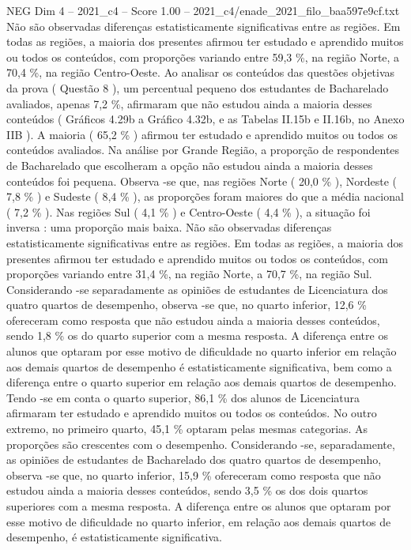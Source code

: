 \begin{textsample}{NEG Dim 4 – 2021\_c4 – Score 1.00 – 2021\_c4/enade\_2021\_filo\_baa597e9cf.txt}
Não são observadas diferenças estatisticamente significativas entre as regiões.
Em todas as regiões, a maioria dos presentes afirmou ter estudado e aprendido muitos ou todos os conteúdos, com proporções variando entre 59,3 \%, na região Norte, a 70,4 \%, na região Centro-Oeste.
Ao analisar os conteúdos das questões objetivas da prova ( Questão 8 ), um percentual pequeno dos estudantes de Bacharelado avaliados, apenas 7,2 \%, afirmaram que não estudou ainda a maioria desses conteúdos ( Gráficos 4.29b a Gráfico 4.32b, e as Tabelas II.15b e II.16b, no Anexo IIB ).
A maioria ( 65,2 \% ) afirmou ter estudado e aprendido muitos ou todos os conteúdos avaliados.
Na análise por Grande Região, a proporção de respondentes de Bacharelado que escolheram a opção não estudou ainda a maioria desses conteúdos foi pequena.
Observa -se que, nas regiões Norte ( 20,0 \% ), Nordeste ( 7,8 \% ) e Sudeste ( 8,4 \% ), as proporções foram maiores do que a média nacional ( 7,2 \% ).
Nas regiões Sul ( 4,1 \% ) e Centro-Oeste ( 4,4 \% ), a situação foi inversa : uma proporção mais baixa.
Não são observadas diferenças estatisticamente significativas entre as regiões.
Em todas as regiões, a maioria dos presentes afirmou ter estudado e aprendido muitos ou todos os conteúdos, com proporções variando entre 31,4 \%, na região Norte, a 70,7 \%, na região Sul.
Considerando -se separadamente as opiniões de estudantes de Licenciatura dos quatro quartos de desempenho, observa -se que, no quarto inferior, 12,6 \% ofereceram como resposta que não estudou ainda a maioria desses conteúdos, sendo 1,8 \% os do quarto superior com a mesma resposta.
A diferença entre os alunos que optaram por esse motivo de dificuldade no quarto inferior em relação aos demais quartos de desempenho é estatisticamente significativa, bem como a diferença entre o quarto superior em relação aos demais quartos de desempenho.
Tendo -se em conta o quarto superior, 86,1 \% dos alunos de Licenciatura afirmaram ter estudado e aprendido muitos ou todos os conteúdos.
No outro extremo, no primeiro quarto, 45,1 \% optaram pelas mesmas categorias.
As proporções são crescentes com o desempenho.
Considerando -se, separadamente, as opiniões de estudantes de Bacharelado dos quatro quartos de desempenho, observa -se que, no quarto inferior, 15,9 \% ofereceram como resposta que não estudou ainda a maioria desses conteúdos, sendo 3,5 \% os dos dois quartos superiores com a mesma resposta.
A diferença entre os alunos que optaram por esse motivo de dificuldade no quarto inferior, em relação aos demais quartos de desempenho, é estatisticamente significativa.

\end{textsample}
